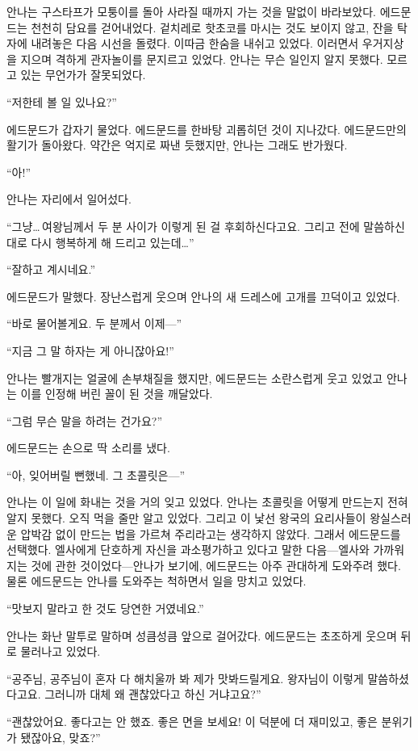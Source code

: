 안나는 구스타프가 모퉁이를 돌아 사라질 때까지 가는 것을 말없이 바라보았다. 에드문드는 천천히 담요를 걷어내었다. 겉치레로 핫초코를 마시는 것도 보이지 않고, 잔을 탁자에 내려놓은 다음 시선을 돌렸다. 이따금 한숨을 내쉬고 있었다. 이러면서 우거지상을 지으며 격하게 관자놀이를 문지르고 있었다. 안나는 무슨 일인지 알지 못했다. 모르고 있는 무언가가 잘못되었다.

``저한테 볼 일 있나요?''

에드문드가 갑자기 물었다. 에드문드를 한바탕 괴롭히던 것이 지나갔다. 에드문드만의 활기가 돌아왔다. 약간은 억지로 짜낸 듯했지만, 안나는 그래도 반가웠다.

``아!''

안나는 자리에서 일어섰다.

``그냥\ldots\,여왕님께서 두 분 사이가 이렇게 된 걸 후회하신다고요. 그리고 전에 말씀하신 대로 다시 행복하게 해 드리고 있는데\ldots''

``잘하고 계시네요.''

에드문드가 말했다. 장난스럽게 웃으며 안나의 새 드레스에 고개를 끄덕이고 있었다.

``바로 물어볼게요. 두 분께서 이제—''

``지금 그 말 하자는 게 아니잖아요!''

안나는 빨개지는 얼굴에 손부채질을 했지만, 에드문드는 소란스럽게 웃고 있었고 안나는 이를 인정해 버린 꼴이 된 것을 깨달았다.

``그럼 무슨 말을 하려는 건가요?''

에드문드는 손으로 딱 소리를 냈다.

``아, 잊어버릴 뻔했네. 그 초콜릿은—''

안나는 이 일에 화내는 것을 거의 잊고 있었다. 안나는 초콜릿을 어떻게 만드는지 전혀 알지 못했다. 오직 먹을 줄만 알고 있었다. 그리고 이 낯선 왕국의 요리사들이 왕실스러운 압박감 없이 만드는 법을 가르쳐 주리라고는 생각하지 않았다. 그래서 에드문드를 선택했다. 엘사에게 단호하게 자신을 과소평가하고 있다고 말한 다음—엘사와 가까워지는 것에 관한 것이었다—안나가 보기에, 에드문드는 아주 관대하게 도와주려 했다. 물론 에드문드는 안나를 도와주는 척하면서 일을 망치고 있었다.

``맛보지 말라고 한 것도 당연한 거였네요.''

안나는 화난 말투로 말하며 성큼성큼 앞으로 걸어갔다. 에드문드는 초조하게 웃으며 뒤로 물러나고 있었다.

``공주님, 공주님이 혼자 다 해치울까 봐 제가 맛봐드릴게요. 왕자님이 이렇게 말씀하셨다고요. 그러니까 대체 왜 괜찮았다고 하신 거냐고요?''

``괜찮았어요. 좋다고는 안 했죠. 좋은 면을 보세요! 이 덕분에 더 재미있고, 좋은 분위기가 됐잖아요, 맞죠?''

